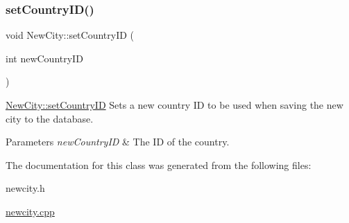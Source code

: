 \subsubsection{\texorpdfstring{setCountryID()}{setCountryID()}}
{\footnotesize\ttfamily void New\+City\+::set\+Country\+ID (\begin{DoxyParamCaption}\item[{int}]{new\+Country\+ID }\end{DoxyParamCaption})}



\mbox{\hyperlink{class_new_city_a8a96f2c58640c96faf74e1f3bb956e4e}{New\+City\+::set\+Country\+ID}} Sets a new country ID to be used when saving the new city to the database. 


\begin{DoxyParams}{Parameters}
{\em new\+Country\+ID} & The ID of the country. \\
\hline
\end{DoxyParams}


The documentation for this class was generated from the following files\+:\begin{DoxyCompactItemize}
\item 
newcity.\+h\item 
\mbox{\hyperlink{newcity_8cpp}{newcity.\+cpp}}\end{DoxyCompactItemize}
